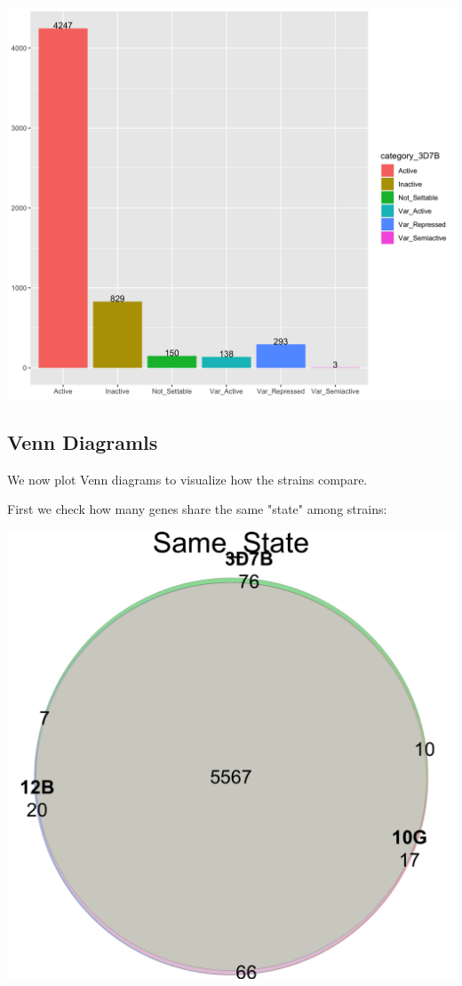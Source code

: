 \documentclass[11pt]{article}
\begin{document}
\begin{center}
\includegraphics[width=.9\linewidth]{./Plots/histogram_3D7B.png}
\end{center}

\subsection{Venn Diagramls}
\label{sec:org02f32e0}
We now plot Venn diagrams to visualize how the strains compare.

First we check how many genes share the same "state" among strains:

\begin{center}
\includegraphics[width=.9\linewidth]{./Plots/venn_Same_State.png}
\end{center}
\end{document}
